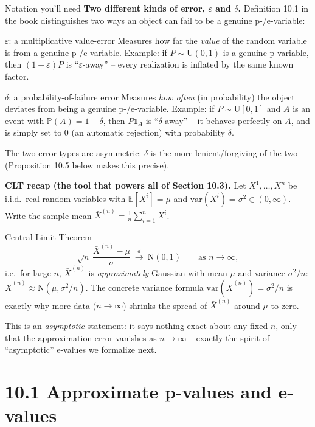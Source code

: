 \documentclass[aspectratio=169,10pt]{beamer}
\newcommand{\E}{\mathbb{E}}
\newcommand{\Pb}{\mathbb{P}}
\begin{document}
\begin{frame}[allowframebreaks]{Notation you'll need}
  \textbf{Two different kinds of error, $\varepsilon$ and $\delta$.} Definition 10.1 in the book distinguishes two ways an object can fail to be a genuine p-/e-variable:
  \begin{block}{$\varepsilon$: a multiplicative value-error}
    Measures how far the \emph{value} of the random variable is from a genuine p-/e-variable. Example: if $P \sim \mathrm{U}(0,1)$ is a genuine p-variable, then $(1+\varepsilon)P$ is ``$\varepsilon$-away'' -- every realization is inflated by the same known factor.
  \end{block}
  \begin{block}{$\delta$: a probability-of-failure error}
    Measures \emph{how often} (in probability) the object deviates from being a genuine p-/e-variable. Example: if $P \sim \mathrm{U}[0,1]$ and $A$ is an event with $\Pb(A) = 1-\delta$, then $P\mathbb{1}_A$ is ``$\delta$-away'' -- it behaves perfectly on $A$, and is simply set to $0$ (an automatic rejection) with probability $\delta$.
  \end{block}
  The two error types are asymmetric: $\delta$ is the more lenient/forgiving of the two (Proposition 10.5 below makes this precise).

  \framebreak

  \textbf{CLT recap (the tool that powers all of Section 10.3).} Let $X^1,\dots,X^n$ be i.i.d.\ real random variables with $\E[X^i]=\mu$ and $\mathrm{var}(X^i)=\sigma^2\in(0,\infty)$. Write the sample mean $\bar X^{(n)} = \frac1n\sum_{i=1}^n X^i$.
  \begin{block}{Central Limit Theorem}
    \[
      \sqrt n \, \frac{\bar X^{(n)} - \mu}{\sigma} \ \xrightarrow{\ d\ }\ \mathrm{N}(0,1) \qquad \text{as } n \to \infty,
    \]
    i.e.\ for large $n$, $\bar X^{(n)}$ is \emph{approximately} Gaussian with mean $\mu$ and variance $\sigma^2/n$: $\bar X^{(n)} \approx \mathrm{N}(\mu, \sigma^2/n)$. The concrete variance formula $\mathrm{var}(\bar X^{(n)}) = \sigma^2/n$ is exactly why more data ($n\to\infty$) shrinks the spread of $\bar X^{(n)}$ around $\mu$ to zero.
  \end{block}
  This is an \emph{asymptotic} statement: it says nothing exact about any fixed $n$, only that the approximation error vanishes as $n\to\infty$ -- exactly the spirit of ``asymptotic'' e-values we formalize next.
\end{frame}

\section{10.1 Approximate p-values and e-values}
\end{document}
